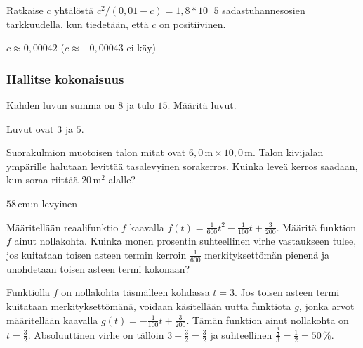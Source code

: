 \begin{tehtavasivu}
\begin{tehtava}
Ratkaise $c$ yhtälöstä $c^2/(0,01-c)=1,8*10^-5$ sadastuhannesosien tarkkuudella, kun tiedetään, että $c$ on positiivinen.
	\begin{vastaus}
	$c\approx 0,00042$ ($c \approx -0,00043$ ei käy)
	\end{vastaus}
\end{tehtava}


\subsubsection*{Hallitse kokonaisuus}

\begin{tehtava}
    Kahden luvun summa on $8$ ja tulo $15$. Määritä luvut.
    \begin{vastaus}
		Luvut ovat $3$ ja $5$.
    \end{vastaus}
\end{tehtava}

\begin{tehtava}
    Suorakulmion muotoisen talon mitat ovat $6,0\,\text{m} \times 10,0$\,m. Talon kivijalan ympärille halutaan levittää tasalevyinen sorakerros. Kuinka leveä kerros saadaan, kun soraa riittää $20$\,m$^2$ alalle?
    \begin{vastaus}
		$58$\,cm:n levyinen
    \end{vastaus}
\end{tehtava}

\begin{tehtava}
    Määritellään reaalifunktio $f$ kaavalla $f(t)=\frac{1}{600}t^2-\frac{1}{100}t+\frac{3}{200}$. Määritä funktion $f$ ainut nollakohta. Kuinka monen prosentin suhteellinen virhe vastaukseen tulee, jos kuitataan toisen asteen termin kerroin $\frac{1}{600}$ merkityksettömän pienenä ja unohdetaan toisen asteen termi kokonaan?
    \begin{vastaus}
Funktiolla $f$ on nollakohta täsmälleen kohdassa $t=3$. Jos toisen asteen termi kuitataan merkityksettömänä, voidaan käsitellään uutta funktiota $g$, jonka arvot määritellään kaavalla $g(t)=-\frac{1}{100}t+\frac{3}{200}$. Tämän funktion ainut nollakohta on $t=\frac{3}{2}$. Absoluuttinen virhe on tällöin $3-\frac{3}{2}=\frac{3}{2}$ ja suhteellinen $\frac{\frac{3}{2}}{3}=\frac{1}{2}=50\,\%$.
    \end{vastaus}
\end{tehtava}


\end{tehtavasivu}
